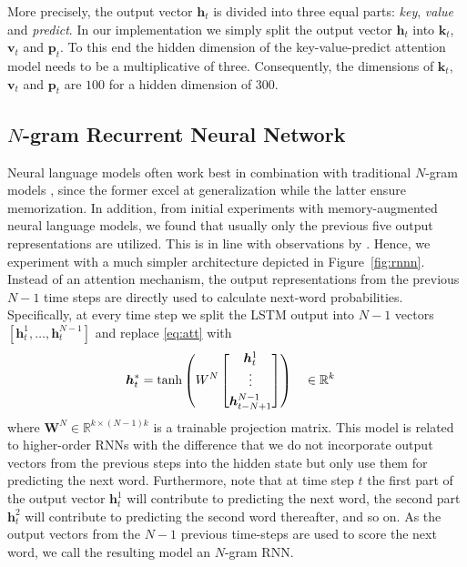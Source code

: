 \documentclass{article}
\newcommand{\vect}[1]{\ensuremath{\bm{#1}}}
\newcommand{\mat}[1]{\ensuremath{\bm{#1}}}
\begin{document}
More precisely, the output vector $\vect{h}_t$ is divided into three equal parts: \emph{key}, \emph{value} and \emph{predict}. 
In our implementation we simply split the output vector $\vect{h}_t$ into $\vect{k}_t$, $\vect{v}_t$ and $\vect{p}_t$. 
To this end the hidden dimension of the key-value-predict attention model needs to be a multiplicative of three. 
Consequently, the dimensions of $\vect{k}_t$, $\vect{v}_t$ and $\vect{p}_t$ are $100$ for a hidden dimension of $300$.  


\subsection{$N$-gram Recurrent Neural Network}
\label{sec:ngram}
Neural language models often work best in combination with traditional $N$-gram models \citep{mikolov2011empirical,chelba2013one,williams2015scaling,ji2015blackout,shazeer2015sparse}, since the former excel at generalization while the latter ensure memorization.
In addition, from initial experiments with memory-augmented neural language models, we found that usually only the previous five output representations are utilized. 
This is in line with observations by \cite{tran2016recurrent}.
Hence, we experiment with a much simpler architecture depicted in Figure~\autoref{fig:rnnn}.
Instead of an attention mechanism, the output representations from the previous $N-1$ time steps are directly used to calculate next-word probabilities.
Specifically, at every time step we split the LSTM output into $N-1$ vectors $[\vect{h}_t^1, \ldots, \vect{h}_t^{N-1}]$ and replace \autoref{eq:att} with
\begin{align}
    \vect{h}_t^* &= \tanh\left(W^N    
\begin{bmatrix}
		\vect{h}_t^1 \\
		\vdots\vspace{0.25em} \\
		\vect{h}_{t-N+1}^{N-1} \\		
\end{bmatrix}
    \right) && \in \mathbb{R}^k \label{eq:rnnn}
\end{align}
where $\mat{W}^N \in \mathbb{R}^{k\times (N-1)k}$ is a trainable projection matrix. 
This model is related to higher-order RNNs \citep{soltani2016higher} with the difference that we do not incorporate output vectors from the previous steps into the hidden state but only use them for predicting the next word.
Furthermore, note that at time step $t$ the first part of the output vector $\vect{h}_t^1$ will contribute to predicting the next word, the second part $\vect{h}_t^2$ will contribute to predicting the second word thereafter, and so on. 
As the output vectors from the $N-1$ previous time-steps are used to score the next word, we call the resulting model an $N$-gram RNN.
\end{document}
